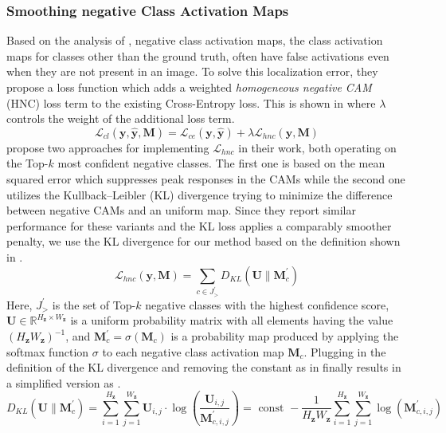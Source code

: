 \subsubsection{Smoothing negative Class Activation Maps}
Based on the analysis of \citet{sun2020fixing}, negative class activation maps, \ie the class activation maps for classes other than the ground truth, often have false activations even when they are not present in an image. To solve this localization error, they propose a loss function which adds a weighted \emph{homogeneous negative CAM} (HNC) loss term to the existing Cross-Entropy loss. This is shown in  where $\lambda$ controls the weight of the additional loss term. 
\begin{equation}
\label{eq:hnc}
\mathcal{L}_{c l}(\mathbf{y}, \mathbf{\hat{y}}, \boldsymbol{M})=\mathcal{L}_{ce}(\mathbf{y}, \mathbf{\hat{y}})+\lambda \mathcal{L}_{hnc}(\mathbf{y}, \boldsymbol{M})
\end{equation}
\citet{sun2020fixing} propose two approaches for implementing $\mathcal{L}_{hnc}$ in their work, both operating on the Top-$k$ most confident negative classes. The first one is based on the mean squared error which suppresses peak responses in the CAMs while the second one utilizes the Kullback–Leibler (KL) divergence trying to minimize the difference between negative CAMs and an uniform map. Since they report similar performance for these variants and the KL loss applies a comparably smoother penalty, we use the KL divergence for our method based on the definition shown in .
\begin{equation}
\label{eq:hnc-kl}
\mathcal{L}_{hnc}(\mathbf{y}, \boldsymbol{M})=\sum_{c \in J^{\prime}_>} D_{K L}\left(\boldsymbol{U} \| \boldsymbol{M}_{c}^{\prime}\right)
\end{equation}
Here, $J^{\prime}_>$ is the set of Top-$k$ negative classes with the highest confidence score, $\boldsymbol{U} \in \mathbb{R}^{H_\mathbf{z} \times W_\mathbf{z}}$ is a uniform probability matrix with all elements having the value $(H_\mathbf{z}W_\mathbf{z})^{-1}$, and $\boldsymbol{M}_{c}^{\prime} = \sigma(\boldsymbol{M}_{c})$ is a probability map produced by applying the softmax function $\sigma$ to each negative class activation map $\boldsymbol{M}_{c}$. Plugging in the definition of the KL divergence and removing the constant as in  finally results in a simplified version as
.
\begin{equation}
\label{eq:kl-simplification}
D_{K L}\left(\boldsymbol{U} \| \boldsymbol{M}_{c}^{\prime}\right)=\sum_{i=1}^{H_\mathbf{z}} \sum_{j=1}^{W_\mathbf{z}} \boldsymbol{U}_{i,j} \cdot \log \left( \frac{\boldsymbol{U}_{i,j}}{\boldsymbol{M}_{c, i, j}^{\prime}} \right) =\text { const }-\frac{1}{H_\mathbf{z} W_\mathbf{z}} \sum_{i=1}^{H_\mathbf{z}} \sum_{j=1}^{W_\mathbf{z}} \log \left(\boldsymbol{M}_{c, i, j}^{\prime}\right)
\end{equation}
